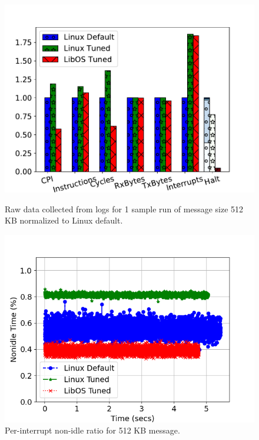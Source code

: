 \begin{figure}[htb]
\centering	
\begin{minipage}[t]{0.45\textwidth}
\includegraphics[width=\textwidth]{osdi_figures/netpipe_524288_barplot.pdf}
	\caption{Raw data collected from logs for 1 sample run of message size 512 KB normalized to Linux default.}
	\label{fig:netpipe524288barplot}
\end{minipage}
\begin{minipage}[t]{0.45\textwidth}
	\includegraphics[width=\columnwidth]{osdi_figures/netpipe_524288_nonidle_timeline.png}
	\caption{Per-interrupt non-idle ratio for 512 KB message.}
	\label{fig:netpipe524288nonidle}
\end{minipage}

\end{figure}
